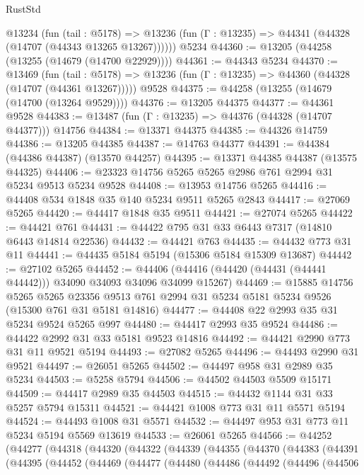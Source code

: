 \begin{lexlean}{RustStd}
\begin{coremodule}
    @13234
      (fun (tail : @5178) =>
      @13236 (fun (Γ : @13235) => @44341 (@44328 (@14707 (@44343 @13265 @13267))))))
    @5234
@44360 := @13205 (@44258 (@13255 (@14679 (@14700 @22929))))
@44361 := @44343 @5234
@44370 := @13469
    (fun (tail : @5178) => @13236 (fun (Γ : @13235) => @44360 (@44328 (@14707 (@44361 @13267)))))
    @9528
@44375 := @44258 (@13255 (@14679 (@14700 (@13264 @9529))))
@44376 := @13205 @44375
@44377 := @44361 @9528
@44383 := @13487 (fun (Γ : @13235) => @44376 (@44328 (@14707 @44377))) @14756
@44384 := @13371 @44375
@44385 := @44326 @14759
@44386 := @13205 @44385
@44387 := @14763 @44377
@44391 := @44384 (@44386 @44387) (@13570 @44257)
@44395 := @13371 @44385 @44387 (@13575 @44325)
@44406 := @23323 @14756 @5265 @5265 @2986 @761 @2994 @31 @5234 @9513 @5234 @9528
@44408 := @13953 @14756 @5265
@44416 := @44408 @534 @1848 @35 @140 @5234 @9511 @5265 @2843
@44417 := @27069 @5265
@44420 := @44417 @1848 @35 @9511
@44421 := @27074 @5265
@44422 := @44421 @761
@44431 := @44422 @795 @31 @33 @6443 @7317 (@14810 @6443 @14814 @22536)
@44432 := @44421 @763
@44435 := @44432 @773 @31 @11
@44441 := @44435 @5184 @5194 (@15306 @5184 @15309 @13687)
@44442 := @27102 @5265
@44452 := @44406 (@44416 (@44420 (@44431 (@44441 @44442))) @34090 @34093 @34096 @34099 @15267)
@44469 := @15885
    @14756
    @5265
    @5265
    @23356
    @9513
    @761
    @2994
    @31
    @5234
    @5181
    @5234
    @9526
    (@15300 @761 @31 @5181 @14816)
@44477 := @44408 @22 @2993 @35 @31 @5234 @9524 @5265 @997
@44480 := @44417 @2993 @35 @9524
@44486 := @44422 @2992 @31 @33 @5181 @9523 @14816
@44492 := @44421 @2990 @773 @31 @11 @9521 @5194
@44493 := @27082 @5265
@44496 := @44493 @2990 @31 @9521
@44497 := @26051 @5265
@44502 := @44497 @958 @31 @2989 @35 @5234
@44503 := @5258 @5794
@44506 := @44502 @44503 @5509 @15171
@44509 := @44417 @2989 @35 @44503
@44515 := @44432 @1144 @31 @33 @5257 @5794 @15311
@44521 := @44421 @1008 @773 @31 @11 @5571 @5194
@44524 := @44493 @1008 @31 @5571
@44532 := @44497 @953 @31 @773 @11 @5234 @5194 @5569 @13619
@44533 := @26061 @5265
@44566 := @44252
    (@44277
      (@44318
        (@44320
          (@44322
            (@44339
              (@44355
                (@44370
                  (@44383
                    (@44391
                      (@44395
                        (@44452
                          (@44469
                            (@44477
                              (@44480
                                (@44486
                                  (@44492
                                    (@44496
                                      (@44506

\end{coremodule}
\end{lexlean}
